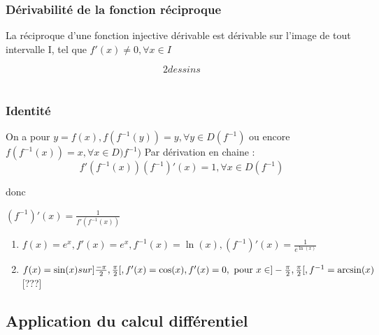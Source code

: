 \documentclass[12pt,a4paper]{article}
\begin{document}
{\subsubsection{Dérivabilité de la fonction réciproque}
\begin{boite}
	\Theoreme La réciproque d'une fonction injective dérivable est dérivable sur l'image de tout intervalle I, tel que $f'(x) \neq 0, \forall x \in I$
\end{boite}
\[2 dessins\]\\
\subsubsection{Identité}
On a pour $y = f(x), f(f^{-1}(y)) = y, \forall y \in D(f^{-1})$ ou encore $f(f^{-1}(x)) = x, \forall x \in D)f^{-1})$
Par dérivation en chaine :
\begin{equation}
f'(f^{-1}(x))(f^{-1})'(x) = 1, \forall x \in D(f^{-1})
\end{equation}

donc 
\begin{boite}
$(f^{-1})'(x) = \frac{1}{f'(f^{-1}(x))}$
\end{boite}

\begin{enumerate}[label=\roman*]
	\item $f(x) = e^x, f'(x)= e^x, f^{-1}(x) = \ln(x), (f^{-1})'(x) = \frac{1}{e^{\ln(x)}}$
	\item $f(x) = \sin(x) sur ]\frac{-\pi}{2},\frac{\pi}{2}[, f'(x) = \cos(x), f'(x) = 0, \mbox{ pour } x \in ]-\frac{\pi}{2}, \frac{\pi}{2}[, f^{-1} = \arcsin(x)$ [???]
\end{enumerate}
\subsection{Application du calcul différentiel}
}
\end{document}
